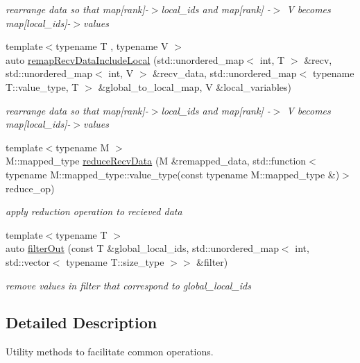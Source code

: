 \begin{DoxyCompactItemize}
\begin{DoxyCompactList}\small\item\em rearrange data so that map\mbox{[}rank\mbox{]}-\/$>$local\-\_\-ids and map\mbox{[}rank\mbox{]} -\/$>$ V becomes map\mbox{[}local\-\_\-ids\mbox{]}-\/$>$values \end{DoxyCompactList}\item 
{\footnotesize template$<$typename T , typename V $>$ }\\auto \hyperlink{namespaceop_1_1utility_afc383f291cdc68bd7ce61ad80270ee20}{remap\-Recv\-Data\-Include\-Local} (std\-::unordered\-\_\-map$<$ int, T $>$ \&recv, std\-::unordered\-\_\-map$<$ int, V $>$ \&recv\-\_\-data, std\-::unordered\-\_\-map$<$ typename T\-::value\-\_\-type, T $>$ \&global\-\_\-to\-\_\-local\-\_\-map, V \&local\-\_\-variables)
\begin{DoxyCompactList}\small\item\em rearrange data so that map\mbox{[}rank\mbox{]}-\/$>$local\-\_\-ids and map\mbox{[}rank\mbox{]} -\/$>$ V becomes map\mbox{[}local\-\_\-ids\mbox{]}-\/$>$values \end{DoxyCompactList}\item 
{\footnotesize template$<$typename M $>$ }\\M\-::mapped\-\_\-type \hyperlink{namespaceop_1_1utility_a50e1b16765534f28440b36350c5fa06d}{reduce\-Recv\-Data} (M \&remapped\-\_\-data, std\-::function$<$ typename M\-::mapped\-\_\-type\-::value\-\_\-type(const typename M\-::mapped\-\_\-type \&)$>$ reduce\-\_\-op)
\begin{DoxyCompactList}\small\item\em apply reduction operation to recieved data \end{DoxyCompactList}\item 
{\footnotesize template$<$typename T $>$ }\\auto \hyperlink{namespaceop_1_1utility_aa1fa4e7ab37ca7240e09c08cfdd4ee91}{filter\-Out} (const T \&global\-\_\-local\-\_\-ids, std\-::unordered\-\_\-map$<$ int, std\-::vector$<$ typename T\-::size\-\_\-type $>$$>$ \&filter)
\begin{DoxyCompactList}\small\item\em remove values in filter that correspond to global\-\_\-local\-\_\-ids \end{DoxyCompactList}\end{DoxyCompactItemize}


\subsection{Detailed Description}
Utility methods to facilitate common operations. 

